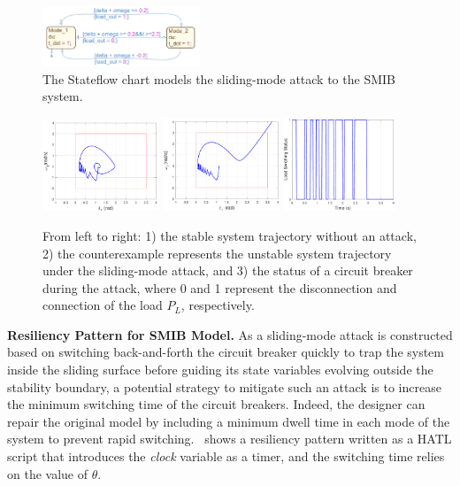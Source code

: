 \begin{figure}[t!]%
	\centering%
    \includegraphics[width=0.42\textwidth]{image/smib_attack_model}%
	\caption{The Stateflow chart models the sliding-mode attack to the SMIB system.}%
\end{figure}%


\begin{figure}[t!]%
	\centering%
    \includegraphics[width=0.31\textwidth]{image/normal}%
		\includegraphics[width=0.31\textwidth]{image/counter}%
		\includegraphics[width=0.3\textwidth]{image/load_v2}%
	\caption{From left to right: 1) the stable system trajectory without an attack, 2) the counterexample represents the unstable system trajectory under the sliding-mode attack, and 3) the status of a circuit breaker during the attack, where 0 and 1 represent the disconnection and connection of the load $P_L$, respectively.}%
\end{figure}%

\vspace{0.5em}
\noindent
{\bf Resiliency Pattern for SMIB Model.} 
As a sliding-mode attack is constructed based on switching back-and-forth the circuit breaker quickly to trap the system inside the sliding surface before guiding its state variables evolving outside the stability boundary, a potential strategy to mitigate such an attack is to increase the minimum switching time of the circuit breakers. Indeed, the designer can repair the original model by including a minimum dwell time in each mode of the system to prevent rapid switching.~ shows a resiliency pattern written as a HATL script that introduces the \emph{clock} variable as a timer, and the switching time relies on the value of $\theta$.

